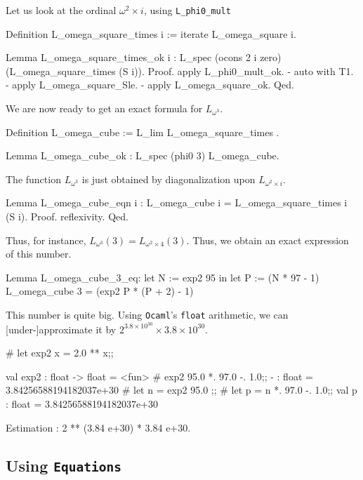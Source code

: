 \documentclass[a4paper]{book}
\begin{document}
Let us look 
at the ordinal $\omega^2\times i$, using \texttt{L\_phi0\_mult}

\begin{Coqsrc}
 Definition L_omega_square_times i :=  iterate L_omega_square i.

 Lemma L_omega_square_times_ok i : 
    L_spec (ocons 2 i zero) (L_omega_square_times (S i)).
 Proof.
  apply L_phi0_mult_ok.
  -  auto with T1.
  -  apply L_omega_square_Sle.
  -  apply L_omega_square_ok.
 Qed.
\end{Coqsrc}


We are now ready to get an exact formula for $L_{\omega^3}$. 
\begin{Coqsrc}
Definition L_omega_cube  := L_lim  L_omega_square_times .

Lemma L_omega_cube_ok : L_spec (phi0 3) L_omega_cube.
\end{Coqsrc}


The function  $L_{\omega^3}$  is just obtained by diagonalization upon $L_{\omega^2\times i}$.

\begin{Coqsrc}
Lemma L_omega_cube_eqn i : 
   L_omega_cube i = L_omega_square_times i (S i).
Proof. reflexivity. Qed.
\end{Coqsrc}

Thus, for instance, $L_{\omega^3}(3)=L_{\omega^2\times 4}(3)$.
Thus, we obtain an exact expression of this number.


\begin{Coqsrc}
Lemma L_omega_cube_3_eq:
   let N := exp2 95 in
   let P := (N * 97 - 1)%
   L_omega_cube 3  =  (exp2 P * (P + 2) - 1)%
\end{Coqsrc}


This number is quite big. Using \texttt{Ocaml}'s \texttt{float} arithmetic,
we can [under-]approximate it by $2^{3.8\times10^{30}}\times 3.8\times{10^{30}}$.

\begin{Coqsrc}
# let exp2 x = 2.0 ** x;;

val exp2 : float -> float = <fun>
#   exp2 95.0 *. 97.0 -. 1.0;;
- : float = 3.84256588194182037e+30
# let n = exp2 95.0 ;;
# let p = n *. 97.0 -. 1.0;;
val p : float = 3.84256588194182037e+30

Estimation :
2 ** (3.84 e+30) * 3.84 e+30.
\end{Coqsrc}


\subsection{Using \texttt{Equations}}
\label{sect:L-equations}
\end{document}
